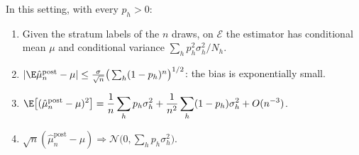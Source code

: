 \begin{proposition}\label{prop:st-post}
In this setting, with every $p_h>0$:
\begin{enumerate}[label=(\roman*)]
  \item Given the stratum labels of the $n$ draws, on $\mathcal E$ the estimator has
    conditional mean $\mu$ and conditional variance $\sum_hp_h^2\sigma_h^2/N_h$.
  \item $|\E\hat\mu^{\mathrm{post}}_n-\mu|\le\frac{\sigma}{\sqrt n}\big(\sum_h(1-p_h)^n\big)^{1/2}$:
    the bias is exponentially small.
  \item $\displaystyle\E\big[(\hat\mu^{\mathrm{post}}_n-\mu)^2\big]
    =\frac1n\sum_hp_h\sigma_h^2+\frac1{n^2}\sum_h(1-p_h)\sigma_h^2+O(n^{-3})$.
  \item $\sqrt n(\hat\mu^{\mathrm{post}}_n-\mu)\Rightarrow\mathcal N\big(0,\sum_hp_h\sigma_h^2\big)$.
\end{enumerate}
\end{proposition}

